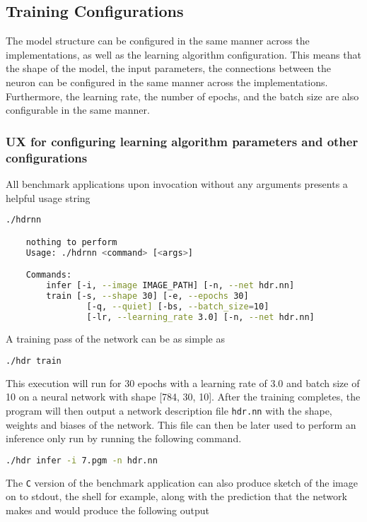 \subsection{Training Configurations}

The model structure can be configured in the same manner across the implementations, as well as the learning algorithm configuration. This means that the shape of the model, the input parameters, the connections between the neuron can be configured in the same manner across the implementations. Furthermore, the learning rate, the number of epochs, and the batch size are also configurable in the same manner.

\subsubsection{UX for configuring learning algorithm parameters and other configurations}

All benchmark applications upon invocation without any arguments presents a helpful usage string

\begin{lstlisting}[language=Bash]
	./hdrnn

	nothing to perform
	Usage: ./hdrnn <command> [<args>]

	Commands:
		infer [-i, --image IMAGE_PATH] [-n, --net hdr.nn]
		train [-s, --shape 30] [-e, --epochs 30]
				[-q, --quiet] [-bs, --batch_size=10]
				[-lr, --learning_rate 3.0] [-n, --net hdr.nn]
\end{lstlisting}

A training pass of the network can be as simple as

\begin{lstlisting}[language=Bash]
	./hdr train
\end{lstlisting}

This execution will run for 30 epochs with a learning rate of 3.0 and batch size of 10 on a neural network with shape [784, 30, 10]. After the training completes, the program will then output a network description file \texttt{hdr.nn} with the shape, weights and biases of the network. This file can then be later used to perform an inference only run by running the following command.

\begin{lstlisting}[language=Bash]
	./hdr infer -i 7.pgm -n hdr.nn
\end{lstlisting}

The \texttt{C} version of the benchmark application can also produce sketch of the image on to stdout, the shell for example, along with the prediction that the network makes and would produce the following output

